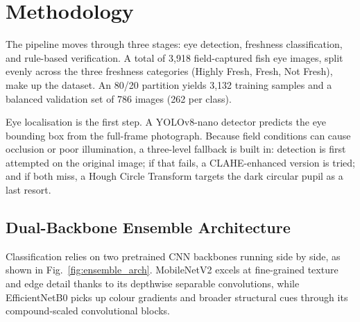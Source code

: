 \documentclass[conference]{IEEEtran}
\begin{document}
\section{Methodology}
The pipeline moves through three stages: eye detection, freshness classification, and rule-based verification. A total of 3,918 field-captured fish eye images, split evenly across the three freshness categories (Highly Fresh, Fresh, Not Fresh), make up the dataset. An 80/20 partition yields 3,132 training samples and a balanced validation set of 786 images (262 per class).

Eye localisation is the first step. A YOLOv8-nano detector \cite{ref23} predicts the eye bounding box from the full-frame photograph. Because field conditions can cause occlusion or poor illumination, a three-level fallback is built in: detection is first attempted on the original image; if that fails, a CLAHE-enhanced version is tried; and if both miss, a Hough Circle Transform targets the dark circular pupil as a last resort.

\subsection{Dual-Backbone Ensemble Architecture}
Classification relies on two pretrained CNN backbones running side by side, as shown in Fig.~\ref{fig:ensemble_arch}. MobileNetV2 \cite{ref21} excels at fine-grained texture and edge detail thanks to its depthwise separable convolutions, while EfficientNetB0 \cite{ref22} picks up colour gradients and broader structural cues through its compound-scaled convolutional blocks.
\end{document}
